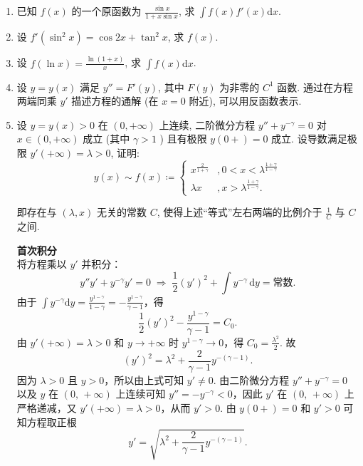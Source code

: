 \begin{enumerate}
    \item[1.]已知 $f(x)$ 的一个原函数为 $\displaystyle\frac{\sin x}{1 + x \sin x}$, 
    求 $\displaystyle\int f(x) f'(x) \mathrm{d}x$.
    
    \item[2.]设 $\displaystyle f'(\sin^2 x) = \cos 2x + \tan^2 x$, 求 $f(x)$.

    \item[3.]设 $\displaystyle f(\ln x) = \frac{\ln(1 + x)}{x}$, 求 $\displaystyle\int f(x) \mathrm{d}x$.

    \item[4.]设 $y = y(x)$ 满足 $\displaystyle y'' = F'(y)$, 其中 $F(y)$ 为非零的 $C^1$ 函数. 
    通过在方程两端同乘 $y'$ 描述方程的通解 (在 $x = 0$ 附近), 可以用反函数表示.

    \item[5.]设 $\displaystyle y = y(x) > 0$ 在 $(0, +\infty)$ 上连续, 二阶微分方程 $\displaystyle y'' + y^{-\gamma} = 0$ 
    对 $x \in (0, +\infty)$ 成立 (其中 $\gamma > 1$ ) 且有极限 $y(0+) = 0$ 成立. 设导数满足极限 $\displaystyle y' (+\infty) = \lambda > 0$, 证明:
    \[
        y(x) \sim f(x)\coloneq
        \begin{cases}
            \displaystyle x^{\frac{2}{1+\gamma}} & \displaystyle, 0<x<\lambda^{\frac{1+\gamma}{1-\gamma}}\\
            \displaystyle \lambda x & \displaystyle, x> \lambda^{\frac{1+\gamma}{1-\gamma}}.
        \end{cases}
    \]
    
    即存在与 $\displaystyle (\lambda, x)$ 无关的常数 $C$, 使得上述“等式”左右两端的比例介于 $\displaystyle\frac{1}{C}$ 与 $C$ 之间.
    \begin{solution}
        \textbf{首次积分}\\
        将方程乘以 $y'$ 并积分：
        \[
        y''y' + y^{-\gamma}y' = 0 \;\Longrightarrow\; \frac12 (y')^2 + \int y^{-\gamma}\,\mathrm{d}y =\text{常数}.
        \]
        由于 $\displaystyle\int y^{-\gamma}\mathrm{d}y = \frac{y^{1-\gamma}}{1-\gamma} = -\frac{y^{1-\gamma}}{\gamma-1}$，得
        \[
        \frac12 (y')^2 - \frac{y^{1-\gamma}}{\gamma-1} = C_0.
        \]
        由 $y'(+\infty)=\lambda>0$ 和 $y\to+\infty$ 时 $y^{1-\gamma}\to0$，得 $\displaystyle C_0 = \frac{\lambda^2}{2}$. 故
        \[
        (y')^2 = \lambda^2 + \frac{2}{\gamma-1} y^{-(\gamma-1)}.
        \]
        因为 $\lambda>0$ 且 $y>0$，所以由上式可知 $y'\neq 0$. 
        由二阶微分方程 $y''+y^{-\gamma}=0$ 以及 $y$ 在 $(0,\,+\infty)$ 上连续可知 $y''=-y^{-\gamma}<0$，因此 $y'$ 在 $(0,\,+\infty)$ 上
        严格递减，又 $y'(+\infty)=\lambda>0$，从而 $y'>0$.
        由 $y(0+)=0$ 和 $y'>0$ 可知方程取正根
        \[
        y' = \sqrt{\lambda^2 + \frac{2}{\gamma-1} y^{-(\gamma-1)}}. \tag{1}
        \]


\end{solution}
\end{enumerate}
